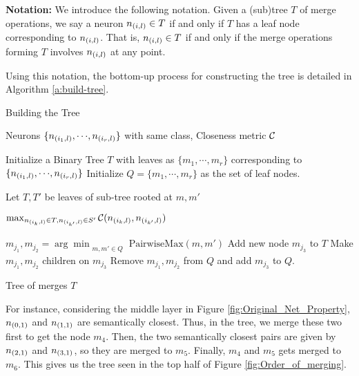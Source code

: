 \textbf{Notation:} We introduce the following notation. Given a (sub)tree $T$ of
merge operations, we say a neuron $n_{(i,l)} \in T$ if and only if $T$ has a
leaf node corresponding to $n_{(i,l)}$. That is, $n_{(i,l)} \in T$ if and only
if the merge operations forming $T$ involves $n_{(i,l)}$ at any point.

Using this notation, the bottom-up process for constructing the tree is detailed
in Algorithm \ref{a:build-tree}.

\begin{algorithm}
\caption{Building the Tree}
\label{a:build-tree}
\begin{algorithmic}[1]

    \Require Neurons $\{n_{(i_1,l)}, {\cdots}, n_{(i_r,l)}\}$ with same class,
    Closeness metric $\mathcal{C}$

    
    \State Initialize a Binary Tree $T$ with leaves as
        $\{m_1, {\cdots}, m_r\}$ corresponding to $\{ n_{(i_1,l)}, {\cdots},
        n_{(i_r,l)} \}$
    \State Initialize $Q=\{m_1, {\cdots}, m_r\}$ as the set of leaf nodes.

        
            \State Let $T, T'$ be leaves of sub-tree rooted at $m, m'$

            \Return $\max_{n_{(i_{k},l)} \in T, n_{(i_{k'},l)} \in S'} 
                \mathcal{C}( n_{(i_{k},l)}, n_{(i_{k'},l)} )$

    \EndFunction

        \State $m_{j_1}, m_{j_2} = \arg\min_{\substack{m, m' \in Q}} 
            \text{PairwiseMax}(m, m')$
        \State Add new node $m_{j_3}$ to $T$ 
        \State Make $m_{j_1}, m_{j_2}$ children on $m_{j_3}$
        \State Remove $m_{j_1}, m_{j_2}$ from $Q$ and add $m_{j_3}$ to $Q$.
    \EndWhile

    \Ensure Tree of merges $T$
\end{algorithmic}
\end{algorithm}

For instance, considering the middle layer in Figure
\ref{fig:Original_Net_Property}, $n_{(0,1)}$ and $n_{(1,1)}$ are semantically
closest. Thus, in the tree, we merge these two first to get the node $m_4$.
Then, the two semantically closest pairs are given by $n_{(2,1)}$ and
$n_{(3,1)}$, so they are merged to $m_5$. Finally, $m_4$ and $m_5$ gets merged
to $m_6$. This gives us the tree seen in the top half of Figure
\ref{fig:Order_of_merging}.

